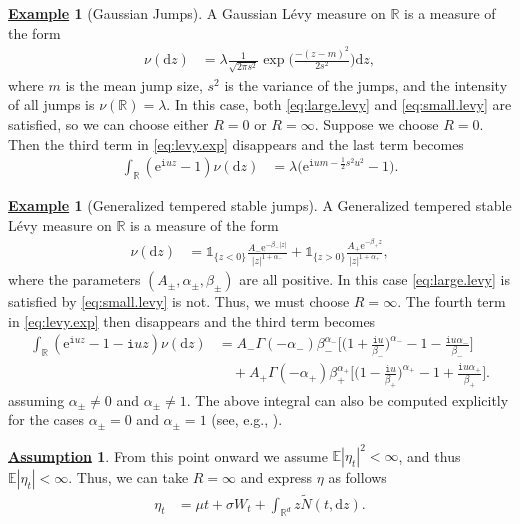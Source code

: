 \documentclass[12pt]{book}
\numberwithin{equation}{chapter}
\theoremstyle{plain}
\numberwithin{theorem}{section}
\theoremstyle{definition}
\newtheorem{example}[theorem]{\underline{Example}}
\newtheorem{assumption}[theorem]{\underline{Assumption}}
\numberwithin{exercise}{chapter}
\newcommand{\<}{\langle}
\renewcommand{\>}{\rangle}
\renewcommand{\(}{\left(}
\renewcommand{\)}{\right)}
\renewcommand{\[}{\left[}
\renewcommand{\]}{\right]}
\newcommand\Eb{\mathds{E}}
\newcommand\Ib{\mathds{1}} 	%
\newcommand\Rb{\mathds{R}}
\newcommand\sig{\sigma}
\newcommand\Gam{\Gamma}
\newcommand\lam{\lambda}
\newcommand\Nt{\widetilde{N}}
\newcommand\ii{\mathtt{i}}
\newcommand\dd{\mathrm{d}}
\newcommand\ee{\mathrm{e}}
\begin{document}
\begin{example}[Gaussian Jumps]
A Gaussian L\'evy measure on $\Rb$ is a measure of the form
\begin{align}
\nu( \dd z)
	&=	\lam \frac{1}{\sqrt{2 \pi s^2}} \exp \Big( \frac{-(z-m)^2}{2 s^2} \Big) \dd z ,
\end{align}
where $m$ is the mean jump size, $s^2$ is the variance of the jumps, and the intensity of all jumps is $\nu(\Rb) = \lam$.  In this case, both \eqref{eq:large.levy} and \eqref{eq:small.levy} are satisfied, so we can choose either $R=0$ or $R = \infty$.  Suppose we choose $R = 0$.  Then the third term in \eqref{eq:levy.exp} disappears and the last term becomes
\begin{align}
\int_\Rb (\ee^{\ii u z} - 1 ) \nu(\dd z)
	&=	\lam \Big( \ee^{\ii u m - \tfrac{1}{2} s^2 u^2 } - 1 \Big) .
\end{align}
\end{example}

\begin{example}[Generalized tempered stable jumps]
A Generalized tempered stable L\'evy measure on $\Rb$ is a measure of the  form
\begin{align}
\nu( \dd z)
	&=	\Ib_{\{ z < 0 \}} \frac{A_- \ee^{-\beta_- |z|}}{|z|^{1+\alpha_-}} + \Ib_{\{ z > 0 \}} \frac{A_+ \ee^{-\beta_+ z}}{|z|^{1+\alpha_+}} ,
\end{align}
where the parameters $(A_\pm,\alpha_\pm,\beta_\pm)$ are all positive.  In this case \eqref{eq:large.levy} is satisfied by \eqref{eq:small.levy} is not.  Thus, we must choose $R = \infty$.  The fourth term in \eqref{eq:levy.exp} then disappears and the third term becomes
\begin{align}
\int_\Rb (\ee^{\ii u z} - 1 - \ii u z) \nu(\dd z)
	&=	A_-  \Gam(-\alpha_-) \beta_-^{\alpha_-} \Big[ \Big( 1 + \frac{\ii u}{\beta_-} \Big)^{\alpha_-} - 1 - \frac{\ii u \alpha_-}{\beta_-} \Big] \\ &\quad
			+ A_+  \Gam(-\alpha_+) \beta_+^{\alpha_+} \Big[ \Big( 1 - \frac{\ii u}{\beta_+} \Big)^{\alpha_+} - 1 + \frac{\ii u \alpha_+}{\beta_+} \Big] .
\end{align}
assuming $\alpha_\pm \neq 0$ and $\alpha_\pm \neq 1$.  The above integral can also be computed explicitly for the cases $\alpha_\pm = 0$ and $\alpha_\pm = 1$ (see, e.g., \cite[Proposition 4.2]{contbook}).
\end{example}

\begin{assumption}
From this point onward we assume $\Eb |\eta_t|^2 < \infty$, and thus $\Eb |\eta_t| < \infty$.  Thus, we can take $R = \infty$ and express $\eta$ as follows
\begin{align}
\eta_t
	&=	\mu t + \sig W_t + \int_{\Rb^d} z \Nt(t,\dd z) . \label{eq:eta.form}
\end{align}
\end{assumption}
\end{document}

